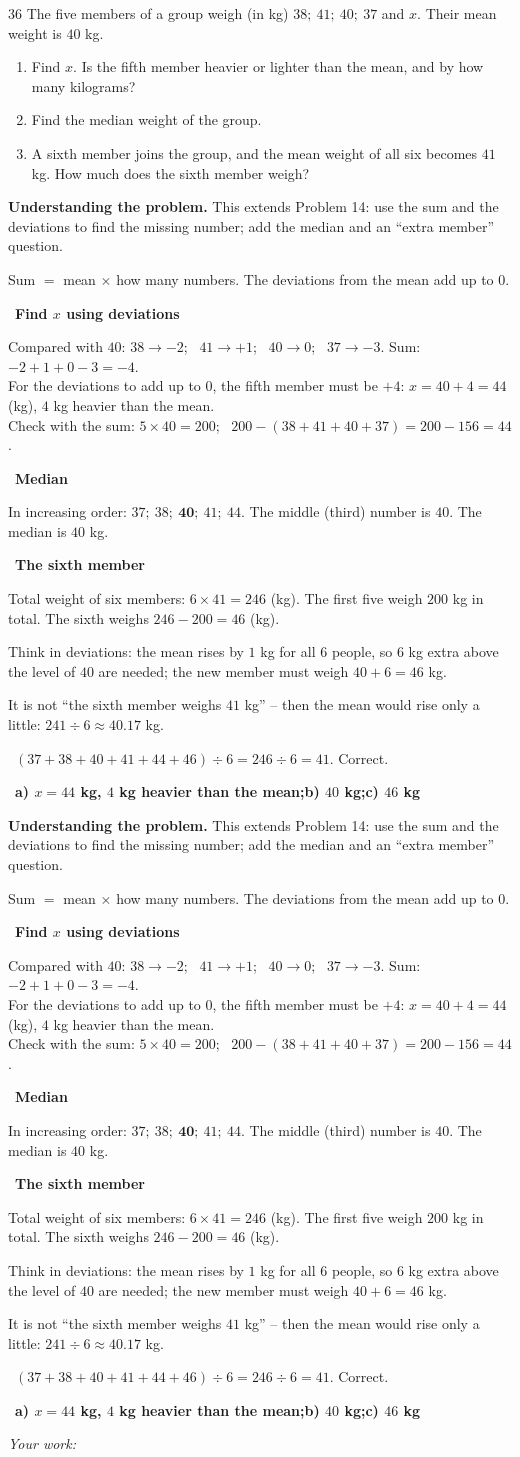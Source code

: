 \documentclass[11pt]{article}
\newif\ifsol \soltrue
\providecommand{\AnsWord}{Đáp số}
\newcommand{\ans}[1]{\par\smallskip{\bfseries\color{tmGreen!88!black}\AnsWord:}\ {\bfseries\color{AnsRed}#1}\par}
\newcommand{\probsol}[1]{%
  \begin{lrbox}{\solmeasure}\begin{minipage}{\dimexpr\linewidth-24pt\relax}#1\end{minipage}\end{lrbox}%
  \ifsol
    \begin{solbox}#1\end{solbox}%
  \else
    \setlength{\solht}{\dimexpr\ht\solmeasure+\dp\solmeasure+0.85cm\relax}%
    \ifdim\solht<1.35cm\setlength{\solht}{1.35cm}\fi
    \ifdim\solht>\StudentMaxWork\setlength{\solht}{\StudentMaxWork}\fi
    \begin{tcolorbox}[colback=white,colframe=Line,boxrule=0.8pt,arc=5pt,
      left=8pt,right=8pt,top=4pt,bottom=4pt,height=\solht]{\footnotesize\color{Slate}\itshape\WorkWord}\end{tcolorbox}%
  \fi}
\newlength{\StudentMaxWork}\setlength{\StudentMaxWork}{7.5cm}
\newcommand{\step}[2]{\par\smallskip\noindent{\bfseries\color{tmBlue!85!black}\StepWord~#1.}\ {\bfseries #2}\par\nopagebreak}
\newcommand{\verify}[1]{\par\smallskip\noindent{\bfseries\color{tmGreen!80!black}\faCheckCircle\ \CheckWord}\ #1\par}
\def\WorkWord{Your work:}
\def\AnsWord{Answer}
\def\StepWord{Step}
\def\CheckWord{Check:}
\begin{document}
\begin{probbox}{36}{\relax}
The five members of a group weigh (in kg) $38;\ 41;\ 40;\ 37$ and $x$. Their mean weight is $40$ kg.
\begin{enumerate}[label=\alph*),leftmargin=1.6em,itemsep=0pt,topsep=2pt]
  \item Find $x$. Is the fifth member heavier or lighter than the mean, and by how many kilograms?
  \item Find the median weight of the group.
  \item A sixth member joins the group, and the mean weight of all six becomes $41$ kg. How much does the sixth member weigh?
\end{enumerate}
\end{probbox}
\probsol{
\textbf{Understanding the problem.} This extends Problem 14: use the sum and the deviations to find the missing number; add
the median and an ``extra member'' question.
\begin{recallbox}Sum $=$ mean $\times$ how many numbers. The deviations from the mean add up to $0$.\end{recallbox}
\step{1}{Find $x$ using deviations}
Compared with $40$: $38 \to -2$; \ $41 \to +1$; \ $40 \to 0$; \ $37 \to -3$. Sum: $-2 + 1 + 0 - 3 = -4$.\\
For the deviations to add up to $0$, the fifth member must be $+4$: $x = 40 + 4 = 44$ (kg), $4$ kg heavier than the mean.\\
Check with the sum: $5\times 40 = 200$; \ $200 - (38 + 41 + 40 + 37) = 200 - 156 = 44$.
\step{2}{Median}
In increasing order: $37;\ 38;\ \mathbf{40};\ 41;\ 44$. The middle (third) number is $40$. The median is $40$ kg.
\step{3}{The sixth member}
Total weight of six members: $6\times 41 = 246$ (kg). The first five weigh $200$ kg in total. The sixth weighs $246 - 200 = 46$ (kg).
\begin{tipbox}Think in deviations: the mean rises by $1$ kg for all $6$ people, so $6$ kg extra above the level of $40$ are needed;
the new member must weigh $40 + 6 = 46$ kg.\end{tipbox}
\begin{warnbox}It is not ``the sixth member weighs $41$ kg'' -- then the mean would rise only a little: $241 \div 6 \approx 40.17$ kg.\end{warnbox}
\verify{$(37 + 38 + 40 + 41 + 44 + 46) \div 6 = 246 \div 6 = 41$. Correct.}
\ans{a) $x = 44$ kg, $4$ kg heavier than the mean;\quad b) $40$ kg;\quad c) $46$ kg}
}
\end{document}
